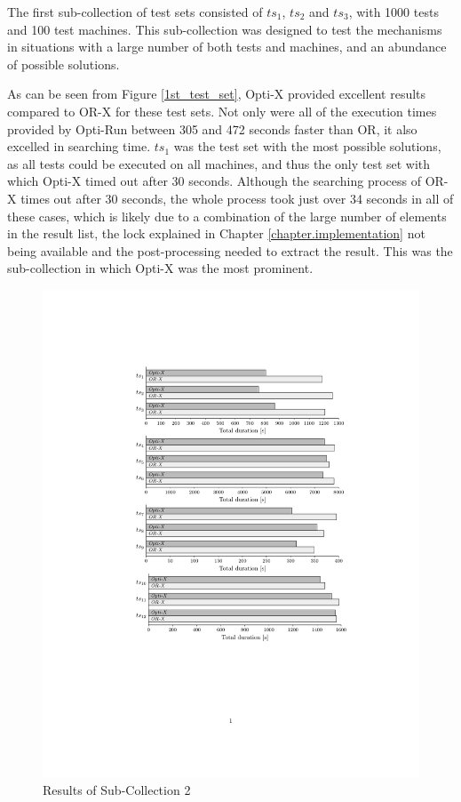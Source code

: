 The first sub-collection of test sets consisted of $ts_1$, $ts_2$ and $ts_3$, with 1000 tests and 100 test machines. This sub-collection was designed to test the mechanisms in situations with a large number of both tests and machines, and an abundance of possible solutions.

As can be seen from Figure \ref{1st_test_set}, Opti-X provided excellent results compared to OR-X for these test sets. Not only were all of the execution times provided by Opti-Run between 305 and 472 seconds faster than OR, it also excelled in searching time. $ts_1$ was the test set with the most possible solutions, as all tests could be executed on all machines, and thus the only test set with which Opti-X timed out after 30 seconds. Although the searching process of OR-X times out after 30 seconds, the whole process took just over 34 seconds in all of these cases, which is likely due to a combination of the large number of elements in the result list, the lock explained in Chapter \ref{chapter.implementation} not being available and the post-processing needed to extract the result. This was the sub-collection in which Opti-X was the most prominent.


\begin{figure}[t]
    \centering
    \includegraphics[width=\textwidth]{figures/test_results/2nd.pdf}
    \caption{Results of Sub-Collection 2}
    \label{2nd_test_set}
\end{figure}

